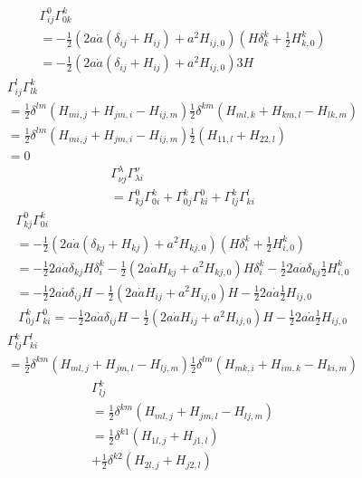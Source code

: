 \documentclass[12pt]{ctexart}
\theoremstyle{definition}
\begin{document}
\begin{eqnarray}
    \Gamma^{0}_{ij}\Gamma^{k}_{0 k}\\
    =-\frac{1}{2}(2a\dot{a}(\delta_{ij}+H_{ij})+a^2{H}_{ij,0})
    (H\delta^k_{k}+\frac{1}{2}H^k_{k,0})\\
    =-\frac{1}{2}(2a\dot{a}(\delta_{ij}+H_{ij})+a^2{H}_{ij,0})3H
\end{eqnarray}
\begin{eqnarray}
    \Gamma^{l}_{ij}\Gamma^{k}_{l k}\\
    =\frac{1}{2}\delta^{lm}(H_{m i,j}+H_{j 
    m,i}-H_{ij,m})\frac{1}{2}\delta^{km}(H_{m l,k}+H_{k
    m,l}-H_{lk,m})\\
    =\frac{1}{2}\delta^{lm}(H_{m i,j}+H_{j 
    m,i}-H_{ij,m})\frac{1}{2}(H_{11,l}+H_{22,l})\\
    =0
\end{eqnarray}
\begin{eqnarray}
    \Gamma^{\lambda}_{\nu j}\Gamma^{\nu}_{\lambda i}\\
    =\Gamma^{0}_{k j}\Gamma^{k}_{0 i}
    +\Gamma^{k}_{0 j}\Gamma^{0}_{k i}
    +\Gamma^{k}_{l j}\Gamma^{l}_{k i}
\end{eqnarray}
\begin{eqnarray}
    \Gamma^{0}_{k j}\Gamma^{k}_{0 i}\\
    =-\frac{1}{2}(2a\dot{a}(\delta_{kj}+H_{kj})+a^2{H}_{kj,0})
    (H\delta^k_{i}+\frac{1}{2}H^k_{i,0})\\
    =-\frac{1}{2}2a\dot{a}\delta_{kj}H\delta^k_{i}
    -\frac{1}{2}(2a\dot{a}H_{kj}+a^2{H}_{kj,0})H\delta^k_{i}
    -\frac{1}{2}2a\dot{a}\delta_{kj}\frac{1}{2}H^k_{i,0}\\
    =-\frac{1}{2}2a\dot{a}\delta_{ij}H
    -\frac{1}{2}(2a\dot{a}H_{ij}+a^2{H}_{ij,0})H
    -\frac{1}{2}2a\dot{a}\frac{1}{2}H_{ij,0}
\end{eqnarray}
\begin{eqnarray}
    \Gamma^{k}_{0 j}\Gamma^{0}_{k i}=-\frac{1}{2}2a\dot{a}\delta_{ij}H
    -\frac{1}{2}(2a\dot{a}H_{ij}+a^2{H}_{ij,0})H
    -\frac{1}{2}2a\dot{a}\frac{1}{2}H_{ij,0}
\end{eqnarray}
\begin{eqnarray}
    \Gamma^{k}_{l j}\Gamma^{l}_{k i}\\
    =\frac{1}{2}\delta^{km}(H_{m l,j}+H_{j 
    m,l}-H_{lj,m})\frac{1}{2}\delta^{lm}(H_{m k,i}+H_{i 
    m,k}-H_{ki,m})
\end{eqnarray}
\begin{eqnarray}
    \Gamma^{k}_{l j}\\
    =\frac{1}{2}\delta^{km}(H_{m l,j}+H_{j 
    m,l}-H_{lj,m})\\
    =\frac{1}{2}\delta^{k1}(H_{1 l,j}+H_{j 
    1,l})\\
    +\frac{1}{2}\delta^{k2}(H_{2 l,j}+H_{j 
    2,l})
\end{eqnarray}
\end{document}
